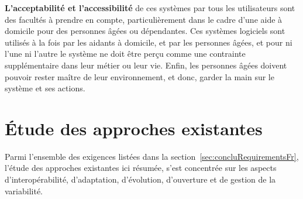 {\bf L'acceptabilité et l'accessibilité} de ces systèmes par tous les utilisateurs sont des facultés à prendre en compte, particulièrement dans le cadre d'une aide à domicile pour des personnes âgées ou dépendantes. Ces systèmes logiciels sont utilisés à la fois par les aidants à domicile, et par les personnes âgées, et pour ni l'une ni l'autre le système ne doit être perçu comme une contrainte supplémentaire dans leur métier ou leur vie. Enfin, les personnes âgées doivent pouvoir rester maître de leur environnement, et donc, garder la main sur le système et ses actions.\\


\section{Étude des approches existantes}

Parmi l'ensemble des exigences listées dans la section~\ref{sec:concluRequirementsFr}, l'étude des approches existantes ici résumée, s'est concentrée sur les aspects d'interopérabilité, d'adaptation, d'évolution, d'ouverture et de gestion de la variabilité.\\

